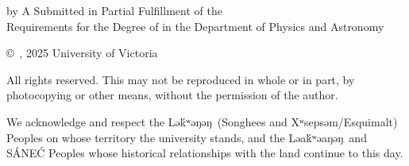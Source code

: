 \pagebreak
{
	\centering
	\thesistitle
	\tpbreak
	by
	\tpbreak
	\nameanddegrees
	\tpbreak
	A \PhDorMas Submitted in Partial Fulfillment of the \\
	Requirements for the Degree of
	\tpbreak
	\PhDorMaster
	\tpbreak
	in the Department of Physics and Astronomy\\
	\vfill
	\begin{center}
		\copyright\ \yourname, 2025 \linebreak
		\phantom{\copyright} University of Victoria
	\end{center}

	All rights reserved. This \PhDorMas may not be reproduced in whole or in part, by photocopying or other means, without the permission of the author.\hfill
    \newline
    
	We acknowledge and respect the Lə\'{k}ʷəŋəŋ\ (Songhees and Xʷsepsəm/Esquimalt) Peoples on whose territory the university stands, and the Ləa\'{k}ʷəaŋəŋ\ and SÁNE\'C Peoples whose historical relationships with the land continue to this day.
    
}
\pagebreak
